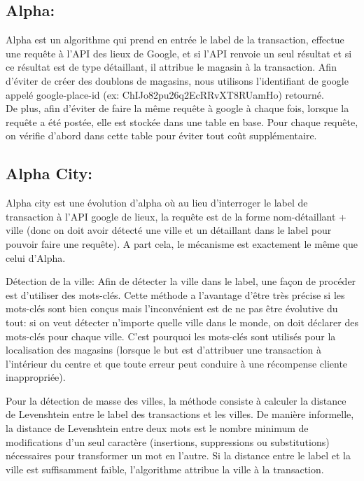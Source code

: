 \subsection{Alpha:}
Alpha est un algorithme qui prend en entrée le label de la transaction, effectue une requête à l'API des lieux de Google, et si l'API renvoie un seul résultat et si ce résultat est de type détaillant, il attribue le magasin à la transaction. Afin d'éviter de créer des doublons de magasins, nous utilisons l'identifiant de google appelé google-place-id (ex: ChIJo82pu26q2EcRRvXT8RUamHo) retourné.\\
De plus, afin d'éviter de faire la même requête à google à chaque fois, lorsque la requête a été postée, elle est stockée dans une table en base.
Pour chaque requête, on vérifie d'abord dans cette table pour éviter tout coût supplémentaire.

\subsection{Alpha City:}
Alpha city est une évolution d'alpha où au lieu d'interroger le label de transaction à l'API google de lieux, la requête est de la forme nom-détaillant + ville (donc on doit avoir détecté une ville et un détaillant dans le label pour pouvoir faire une requête). A part cela, le mécanisme est exactement le même que celui d'Alpha.

Détection de la ville:
Afin de détecter la ville dans le label, une façon de procéder est d'utiliser des mots-clés. Cette méthode a l'avantage d'être très précise si les mots-clés sont bien conçus mais l'inconvénient est de ne pas être évolutive du tout: si on veut détecter n'importe quelle ville dans le monde, on doit déclarer des mots-clés pour chaque ville. C'est pourquoi les mots-clés sont utilisés pour la localisation des magasins (lorsque le but est d'attribuer une transaction à l'intérieur du centre et que toute erreur peut conduire à une récompense cliente inappropriée). 

Pour la détection de masse des villes, la méthode consiste à calculer la distance de Levenshtein entre le label des transactions et les villes. De manière informelle, la distance de Levenshtein entre deux mots est le nombre minimum de modifications d'un seul caractère (insertions, suppressions ou substitutions) nécessaires pour transformer un mot en l'autre. Si la distance entre le label et la ville est suffisamment faible, l'algorithme attribue la ville à la transaction.

